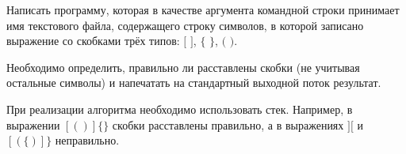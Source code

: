 

Написать программу, которая в качестве аргумента командной строки
принимает имя текстового файла, содержащего строку символов, в
которой записано выражение со скобками трёх типов: $[$ $]$, $\{$ $\}$, $($ $)$.

Необходимо определить, правильно ли расставлены скобки (не учитывая
остальные символы) и напечатать на стандартный выходной поток
результат.

При реализации алгоритма необходимо использовать стек.
Например, в выражении $[()]\{\}$ скобки расставлены правильно, а в
выражениях $][$ и $[(\{)]\}$ неправильно.
